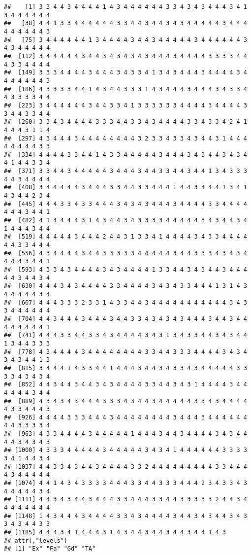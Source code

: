 \documentclass[
]{article}
\begin{document}
\begin{verbatim}
##    [1] 3 3 4 4 3 4 4 4 4 1 4 3 4 4 4 4 4 4 3 3 4 3 4 3 4 4 4 3 4 1 3 4 4 4 4 4 4
##   [38] 4 4 1 3 3 4 4 4 4 4 4 3 3 4 4 3 4 4 3 4 3 4 4 4 4 4 3 4 4 4 4 4 4 4 4 4 3
##   [75] 3 4 4 4 4 4 4 1 3 4 4 4 4 3 4 4 3 4 4 4 4 4 3 4 4 4 4 4 4 3 4 3 4 4 4 4 4
##  [112] 3 4 4 4 4 4 3 4 4 3 4 3 4 3 4 3 4 4 4 3 4 4 4 4 3 3 3 3 4 4 4 3 3 4 4 4 4
##  [149] 3 3 3 4 4 4 4 3 4 4 4 3 4 3 3 4 1 3 4 3 4 4 4 3 4 4 4 4 3 4 4 4 4 4 4 4 3
##  [186] 4 3 3 3 3 4 4 1 4 3 4 4 3 3 3 1 4 3 4 4 4 3 4 4 4 3 4 3 3 4 4 3 3 3 3 4 4
##  [223] 3 4 4 4 4 4 4 3 4 4 3 3 4 1 3 3 3 3 3 3 4 4 4 4 3 4 4 4 4 3 3 4 4 3 3 4 4
##  [260] 3 3 4 3 4 4 4 4 3 3 3 4 4 3 3 4 3 4 4 4 4 3 3 4 3 3 4 2 4 1 4 4 4 3 1 1 4
##  [297] 4 3 4 4 4 3 4 4 4 4 4 4 4 4 3 2 3 3 4 3 3 4 3 4 4 3 1 4 4 4 4 4 4 4 4 3 3
##  [334] 4 4 4 4 3 3 4 4 1 4 3 3 4 4 4 4 4 3 4 4 4 3 4 3 4 4 3 4 3 4 4 1 4 4 3 3 4
##  [371] 3 3 4 4 3 4 4 4 4 4 3 4 4 4 3 4 4 3 3 4 4 3 4 4 1 3 4 3 3 3 4 4 3 4 4 4 4
##  [408] 3 4 4 4 4 4 3 4 4 4 3 3 4 4 3 3 4 4 4 1 4 4 3 4 4 4 1 3 4 1 4 3 4 4 2 3 4
##  [445] 4 4 4 3 3 4 3 3 4 4 4 3 4 3 4 3 4 4 4 3 4 4 4 4 3 3 4 4 4 4 4 4 4 3 4 4 1
##  [482] 4 1 4 4 4 4 3 1 4 3 4 4 3 4 3 3 3 3 4 4 4 4 4 3 4 3 4 4 3 4 1 4 4 4 3 4 4
##  [519] 4 4 4 4 4 3 4 4 4 2 4 4 3 1 3 3 4 1 4 4 4 4 3 4 3 3 4 4 4 4 4 4 3 3 4 4 4
##  [556] 4 3 4 4 4 4 3 4 4 3 3 3 3 3 4 4 4 4 4 3 4 4 3 3 3 4 3 4 3 4 4 4 4 3 4 4 1
##  [593] 4 3 3 4 3 4 4 4 4 3 4 3 4 4 4 4 1 3 3 4 4 3 4 3 4 4 3 4 4 4 4 4 3 4 4 3 4
##  [630] 4 4 4 3 4 3 4 4 4 4 3 3 4 4 4 4 3 4 3 4 3 3 4 4 4 1 3 1 4 3 4 4 4 4 4 3 4
##  [667] 4 4 4 3 3 3 2 3 3 1 4 3 3 4 4 3 4 4 4 4 4 4 4 4 4 4 4 3 4 3 3 4 4 4 4 4 4
##  [704] 4 4 3 4 4 4 3 4 4 4 3 4 4 3 3 4 3 4 3 4 3 4 4 4 3 4 4 3 4 4 4 4 4 4 4 4 1
##  [741] 4 4 4 3 3 4 4 3 3 4 3 4 4 4 4 3 4 3 1 3 4 3 3 4 4 3 4 3 4 4 1 3 4 4 3 3 3
##  [778] 4 3 4 4 4 4 3 4 4 4 4 4 4 4 4 3 3 4 4 3 3 3 4 4 4 4 3 4 3 4 3 4 3 4 4 1 3
##  [815] 3 4 4 4 1 4 3 3 4 4 1 4 4 4 3 4 4 3 4 3 3 4 3 4 4 4 4 4 3 3 3 3 4 3 4 3 4
##  [852] 4 4 3 4 4 3 4 4 3 4 3 4 4 4 4 3 3 4 4 3 4 3 1 4 4 4 4 3 4 4 4 4 4 4 3 4 4
##  [889] 4 3 4 3 4 3 4 4 4 3 3 3 4 3 4 4 3 4 4 4 4 4 3 3 4 3 4 4 4 4 4 3 3 4 4 4 3
##  [926] 4 4 4 4 3 3 3 4 4 4 3 4 4 4 4 4 4 4 4 3 4 4 4 3 4 4 4 4 4 4 4 4 3 3 3 3 4
##  [963] 4 3 3 4 4 4 4 3 4 4 4 4 4 1 4 4 4 3 4 4 3 4 4 4 4 3 4 3 4 4 4 4 3 4 3 4 3
## [1000] 4 3 3 3 4 4 4 4 4 3 4 4 4 4 4 3 4 3 4 1 4 4 4 4 4 4 3 3 3 3 3 4 1 4 4 3 4
## [1037] 4 4 3 3 4 3 4 4 3 4 4 4 4 3 3 2 4 4 4 4 4 4 4 4 4 3 3 4 4 4 4 3 4 4 4 4 4
## [1074] 4 4 1 4 3 4 3 3 3 3 4 4 4 3 3 4 4 3 3 3 4 4 4 2 3 4 3 3 4 3 4 4 4 4 4 3 4
## [1111] 4 4 3 4 3 4 4 3 4 4 4 3 3 4 4 4 3 3 4 4 3 3 3 3 3 2 4 4 3 4 4 4 4 4 4 4 4
## [1148] 1 4 3 4 4 4 3 4 4 4 4 3 3 4 3 4 4 4 4 3 4 4 3 4 3 4 4 3 4 3 3 4 3 4 4 3 3
## [1185] 4 4 4 3 4 1 4 4 4 3 1 4 3 4 4 3 4 4 3 4 4 3 4 4 1 4 3
## attr(,"levels")
## [1] "Ex" "Fa" "Gd" "TA"
\end{verbatim}
\end{document}
